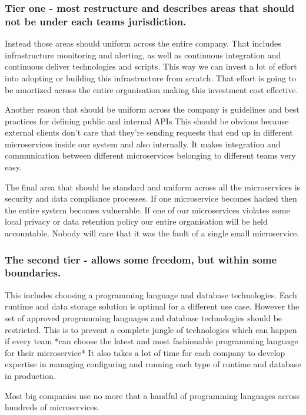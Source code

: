\subsubsection{Tier one - most restructure and describes areas that should not be under each teams jurisdiction.}
Instead those areas should uniform across the entire company.
That includes infrastructure monitoring and alerting, as well as continuous integration and continuous deliver technologies and scripts.
This way we can invest a lot of effort into adopting or building this infrastructure from scratch.
That effort is going to be amortized across the entire organisation making this investment cost effective.

Another reason that should be uniform across the company is guidelines and best practices for defining public and internal APIs
This should be obvious because external clients don't care that they're sending requests that end up in different microservices inside our system and also internally.
It makes integration and communication between different microservices belonging to different teams very easy.

The final area that should be standard and uniform across all the microservices is security and data compliance processes.
If one microservice becomes hacked then the entire system becomes vulnerable.
If one of our microservices violates some local privacy or data retention policy our entire organisation will be held accountable.
Nobody will care that it was the fault of a single small microservice.

\subsubsection{The second tier - allows some freedom, but within some boundaries.}
This includes choosing a programming language and database technologies.
Each runtime and data storage solution is optimal for a different use case.
However the set of approved programming languages and database technologies should be restricted.
This is to prevent a complete jungle of technologies which can happen if every team *can choose the latest and most fashionable programming language for their microservice*
It also takes a lot of time for each company to develop expertise in managing configuring and running each type of runtime and database in production.

Most big companies use no more that a handful of programming languages across hundreds of microservices.

